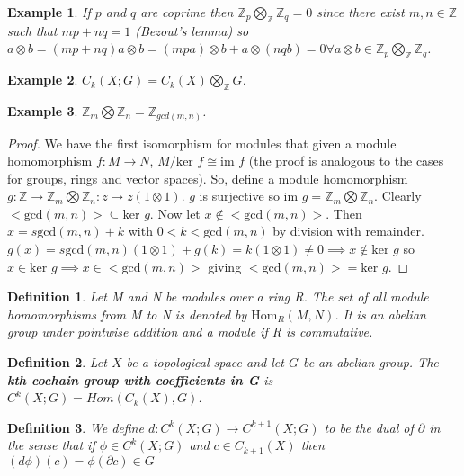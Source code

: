 \documentclass{report}
\newtheorem{definition}{Definition}
\newtheorem{example}{Example}
\begin{document}
\begin{example}
If $p$ and $q$ are coprime then $\mathbb{Z}_p\bigotimes_\mathbb{Z}\mathbb{Z}_q=0$ since there exist $m,n\in\mathbb{Z}$ such that $mp+nq=1$ (Bezout's lemma) so $a\otimes b=(mp+nq)a\otimes b=(mpa)\otimes b + a\otimes(nqb)=0\forall a\otimes b\in\mathbb{Z}_p\bigotimes_\mathbb{Z}\mathbb{Z}_q$.
\end{example}
\begin{example}
$C_k(X;G)=C_k(X)\bigotimes_\mathbb{Z}G$.
\end{example}

\begin{example}
$\mathbb{Z}_m\bigotimes\mathbb{Z}_n=\mathbb{Z}_{gcd(m,n)}$.
\end{example}
\begin{proof}
We have the first isomorphism for modules that given a module homomorphism $f:M\to N$, $M/\text{ker }f\cong\text{im }f$ (the proof is analogous to the cases for groups, rings and vector spaces).
So, define a module homomorphism $g\colon\mathbb{Z}\to\mathbb{Z}_m\bigotimes\mathbb{Z}_n:z\mapsto z(1\otimes 1)$. $g$ is surjective so $\text{im }g=\mathbb{Z}_m\bigotimes\mathbb{Z}_n$. Clearly $<\text{gcd}(m,n)>\subseteq\text{ker }g$. Now let $x\notin <\text{gcd}(m,n)>$. Then $x=s\text{gcd}(m,n)+k$ with $0<k<\text{gcd}(m,n)$ by division with remainder. $g(x)=s\text{gcd}(m,n)(1\otimes 1)+g(k)=k(1\otimes 1)\neq 0\implies x\notin\text{ker }g$ so $x\in\text{ker }g\implies x\in<\text{gcd}(m,n)>$ giving $<\text{gcd}(m,n)>=\text{ker }g$.
\end{proof}


\begin{definition}
Let M and N be modules over a ring R. The set of all module homomorphisms from M to N is denoted by $\text{Hom}_R(M,N)$. It is an abelian group under pointwise addition and a module if R is commutative.
\end{definition}

\begin{definition}
Let $X$ be a topological space and let $G$ be an abelian group. The \textbf{kth cochain group with coefficients in G} is $C^k(X;G)=Hom(C_k(X),G)$. 
\end{definition}

\begin{definition}
We define $d\colon C^k(X;G)\to C^{k+1}(X;G)$ to be the dual of $\partial$ in the sense that if $\phi\in C^k(X;G)$ and $c\in C_{k+1}(X)$ then $(d\phi)(c)=\phi(\partial c)\in G$
\end{definition}
\end{document}
